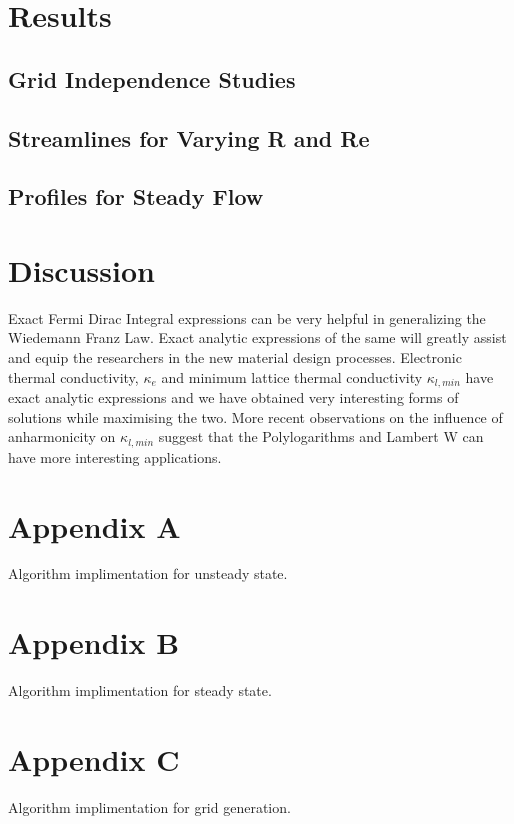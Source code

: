 \documentclass{article}
\begin{document}
\section{Results}

\subsection{Grid Independence Studies}

\subsection{Streamlines for Varying R and Re}

\subsection{Profiles for Steady Flow}

\section{Discussion}
Exact Fermi Dirac Integral expressions can be very helpful in generalizing the Wiedemann Franz  Law. Exact analytic expressions of the same will greatly assist and equip the researchers in the new material design processes.  Electronic thermal conductivity, $\kappa_e$ and minimum lattice thermal conductivity $\kappa_{l,min}$  have exact analytic expressions and we have obtained very interesting forms of solutions while maximising the two. More recent observations on the influence of anharmonicity on  $\kappa_{l,min}$  suggest that the Polylogarithms and Lambert W can have more interesting applications.

\section*{Appendix A}
Algorithm implimentation for unsteady state.


\section*{Appendix B}
Algorithm implimentation for steady state.


\section*{Appendix C}
Algorithm implimentation for grid generation.




\end{document}
